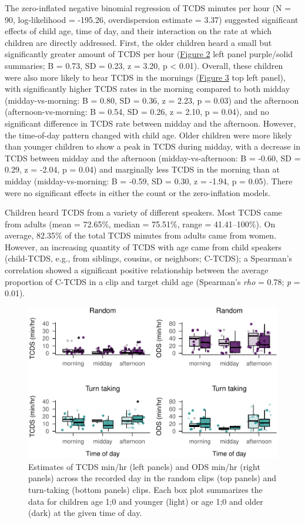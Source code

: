 \documentclass[,man,floatsintext]{apa6}
\begin{document}
The zero-inflated negative binomial regression of TCDS minutes per hour
(N = 90, log-likelihood = -195.26, overdispersion estimate = 3.37)
suggested significant effects of child age, time of day, and their
interaction on the rate at which children are directly addressed. First,
the older children heard a small but significantly greater amount of
TCDS per hour (\protect\hyperlink{fig2}{Figure 2} left panel
purple/solid summaries; B = 0.73, SD = 0.23, z = 3.20, p \textless{}
0.01). Overall, these children were also more likely to hear TCDS in the
mornings (\protect\hyperlink{fig3}{Figure 3} top left panel), with
significantly higher TCDS rates in the morning compared to both midday
(midday-vs-morning: B = 0.80, SD = 0.36, z = 2.23, p = 0.03) and the
afternoon (afternoon-vs-morning: B = 0.54, SD = 0.26, z = 2.10, p =
0.04), and no significant difference in TCDS rate between midday and the
afternoon. However, the time-of-day pattern changed with child age.
Older children were more likely than younger children to show a peak in
TCDS during midday, with a decrease in TCDS between midday and the
afternoon (midday-vs-afternoon: B = -0.60, SD = 0.29, z = -2.04, p =
0.04) and marginally less TCDS in the morning than at midday
(midday-vs-morning: B = -0.59, SD = 0.30, z = -1.94, p = 0.05). There
were no significant effects in either the count or the zero-inflation
models.

Children heard TCDS from a variety of different speakers. Most TCDS came
from adults (mean = 72.65\%, median = 75.51\%, range = 41.41--100\%). On
average, 82.35\% of the total TCDS minutes from adults came from women.
However, an increasing quantity of TCDS with age came from child
speakers (child-TCDS, e.g., from siblings, cousins, or neighbors;
C-TCDS); a Spearman's correlation showed a significant positive
relationship between the average proportion of C-TCDS in a clip and
target child age (Spearman's \emph{rho} = 0.78; \emph{p} = 0.01).

\begin{figure}
\centering
\includegraphics{Yeli-CLE_files/figure-latex/fig3-1.pdf}
\caption{\label{fig:fig3}Estimates of TCDS min/hr (left panels) and ODS
min/hr (right panels) across the recorded day in the random clips (top
panels) and turn-taking (bottom panels) clips. Each box plot summarizes
the data for children age 1;0 and younger (light) or age 1;0 and older
(dark) at the given time of day.}
\end{figure}
\end{document}
